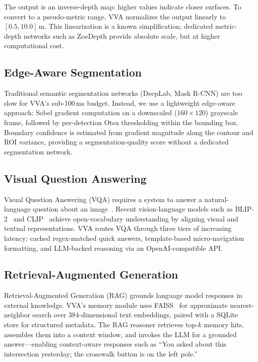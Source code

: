 The output is an inverse-depth map: higher values indicate closer surfaces. To convert to a pseudo-metric range, VVA normalizes the output linearly to $[0.5, 10.0]$\,m. This linearization is a known simplification; dedicated metric-depth networks such as ZoeDepth provide absolute scale, but at higher computational cost.

\subsection{Edge-Aware Segmentation}

Traditional semantic segmentation networks (DeepLab, Mask R-CNN) are too slow for VVA's sub-100\,ms budget. Instead, we use a lightweight edge-aware approach: Sobel gradient computation on a downscaled ($160{\times}120$) grayscale frame, followed by per-detection Otsu thresholding within the bounding box. Boundary confidence is estimated from gradient magnitude along the contour and ROI variance, providing a segmentation-quality score without a dedicated segmentation network.

\subsection{Visual Question Answering}

Visual Question Answering (VQA) requires a system to answer a natural-language question about an image~\cite{antol2015vqa}. Recent vision-language models such as BLIP-2~\cite{li2023blip2} and CLIP~\cite{radford2021clip} achieve open-vocabulary understanding by aligning visual and textual representations. VVA routes VQA through three tiers of increasing latency: cached regex-matched quick answers, template-based micro-navigation formatting, and LLM-backed reasoning via an OpenAI-compatible API.

\subsection{Retrieval-Augmented Generation}

Retrieval-Augmented Generation (RAG) grounds language model responses in external knowledge. VVA's memory module uses FAISS~\cite{faiss2024} for approximate nearest-neighbor search over 384-dimensional text embeddings, paired with a SQLite store for structured metadata. The RAG reasoner retrieves top-$k$ memory hits, assembles them into a context window, and invokes the LLM for a grounded answer---enabling context-aware responses such as ``You asked about this intersection yesterday; the crosswalk button is on the left pole.''

